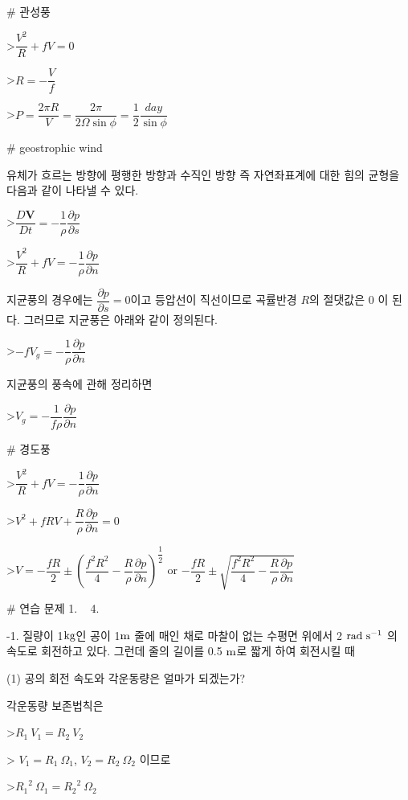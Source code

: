 # 관성풍

>$  \dfrac{V^{2}}{R} + fV = 0$

>$ R = - \dfrac{V}{f} $

>$ P = \dfrac{2 \pi R}{V} =  \dfrac{2 \pi }{2 \Omega \sin \phi} =  \dfrac{1}{2}  \dfrac{day}{\sin \phi}$


# geostrophic wind

유체가 흐르는 방향에 평행한 방향과 수직인 방향 즉 자연좌표계에 대한 힘의 균형을 다음과 같이 나타낼 수 있다.

>$ \dfrac{D\mathbf{V}}{Dt} = - \dfrac{1}{\rho} \dfrac{\partial p}{\partial s}$

>$  \dfrac{V^{2}}{R} + fV = - \dfrac{1}{\rho} \dfrac{\partial p}{\partial n}$

지균풍의 경우에는 $\dfrac{\partial p}{\partial s} = 0$이고 등압선이 직선이므로 곡률반경 $R$의 절댓값은 $0$ 이 된다. 그러므로 지균풍은 아래와 같이 정의된다.

>$-f V_{g} = -\dfrac{1}{\rho}\dfrac{\partial p}{\partial n}$ 

지균풍의 풍속에 관해 정리하면

>$V_{g} = -\dfrac{1}{f \rho}\dfrac{\partial p}{\partial n}$ 



# 경도풍

>$  \dfrac{V^{2}}{R} + fV = - \dfrac{1}{\rho} \dfrac{\partial p}{\partial n}$

>$ V^{2} + fRV + \dfrac{R}{\rho} \dfrac{\partial p}{\partial n} = 0$

>$ V = -\dfrac{fR}{2} \pm \left( \dfrac{f^{2} R^{2}}{4} - \dfrac{R}{\rho}\dfrac{\partial p}{\partial n} \right)^{\dfrac{1}{2}} $ or $ - \dfrac{fR}{2} \pm \sqrt{ \dfrac{f^{2} R^{2}}{4} - \dfrac{R}{\rho}\dfrac{\partial p}{\partial n} }$



# 연습 문제 1. ~ 4.


-1. 질량이 1$\rm kg$인 공이 1$\rm m$ 줄에 매인 채로 마찰이 없는 수평면 위에서 2 $\rm rad ~ s^{-1}$ 의 속도로 회전하고 있다. 그런데 줄의 길이를 0.5 $\rm m$로 짧게 하여 회전시킬 때 

(1) 공의 회전 속도와 각운동량은 얼마가 되겠는가?

각운동량 보존법칙은 

>$ R_{1}~ V_{1} = R_{2}~ V_{2}$

> $ V_{1} = R_{1}~ \Omega_{1}$,  $ V_{2} = R_{2}~ \Omega_{2}$ 이므로

>$ {R_{1}}^{2}~ \Omega_{1} = {R_{2}}^{2}~ \Omega_{2}$

